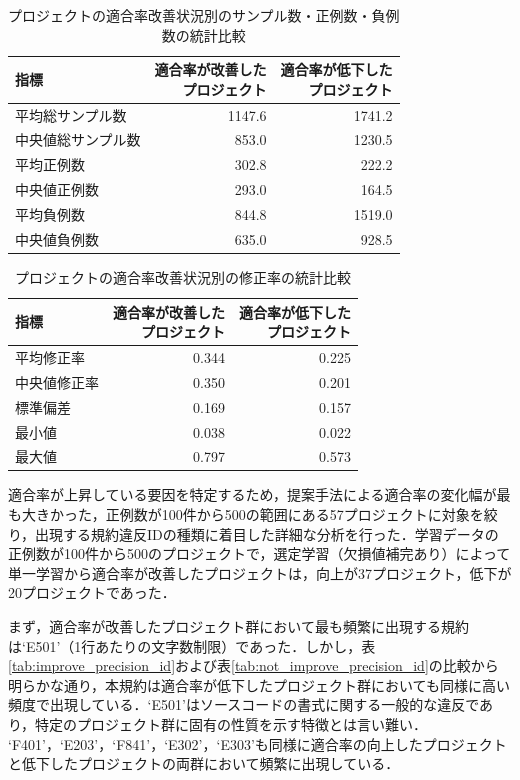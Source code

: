 \documentclass[11pt]{jreport}
\begin{document}
\begin{table}[ht]
  \centering
  \small 
  \caption{プロジェクトの適合率改善状況別のサンプル数・正例数・負例数の統計比較}
\label{table:positive_sample}
  \begin{tabular}{lrr}
    \toprule
    指標 & \makecell[r]{適合率が改善した\\プロジェクト} & \makecell[r]{適合率が低下した\\プロジェクト} \\
    \midrule
    平均総サンプル数 & 1147.6 & 1741.2 \\
    中央値総サンプル数 & 853.0 & 1230.5 \\
    平均正例数 & 302.8 & 222.2 \\
    中央値正例数 & 293.0 & 164.5 \\
    平均負例数 & 844.8 & 1519.0 \\
    中央値負例数 & 635.0 & 928.5 \\
    \bottomrule
  \end{tabular}
\end{table}

\begin{table}[ht]
  \centering
  \small
  \caption{プロジェクトの適合率改善状況別の修正率の統計比較}
    \label{table:positive_rate}
  \begin{tabular}{lrr}
    \toprule
    指標 & \makecell[r]{適合率が改善した\\プロジェクト} & \makecell[r]{適合率が低下した\\プロジェクト} \\
    \midrule
    平均修正率 & 0.344 & 0.225 \\
    中央値修正率 & 0.350 & 0.201 \\
    標準偏差 & 0.169 & 0.157 \\
    最小値 & 0.038 & 0.022 \\
    最大値 & 0.797 & 0.573 \\
    \bottomrule
  \end{tabular}
\end{table}

適合率が上昇している要因を特定するため，提案手法による適合率の変化幅が最も大きかった，正例数が100件から500の範囲にある57プロジェクトに対象を絞り，出現する規約違反IDの種類に着目した詳細な分析を行った．学習データの正例数が100件から500のプロジェクトで，選定学習（欠損値補完あり）によって単一学習から適合率が改善したプロジェクトは，向上が37プロジェクト，低下が20プロジェクトであった．

まず，適合率が改善したプロジェクト群において最も頻繁に出現する規約は`E501'（1行あたりの文字数制限）であった．しかし，表\ref{tab:improve_precision_id}および表\ref{tab:not_improve_precision_id}の比較から明らかな通り，本規約は適合率が低下したプロジェクト群においても同様に高い頻度で出現している．`E501'はソースコードの書式に関する一般的な違反であり，特定のプロジェクト群に固有の性質を示す特徴とは言い難い．
`F401'，`E203'，`F841'，`E302'，`E303'も同様に適合率の向上したプロジェクトと低下したプロジェクトの両群において頻繁に出現している．
\end{document}
